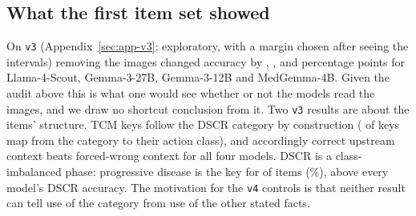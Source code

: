 \begin{table}[t]
\centering
\footnotesize
\setlength{\tabcolsep}{3pt}

\caption{E2: share of answers (\%) that equal the donor's key when the image is swapped, and when there is no image; the gain is the difference in percentage points.}
\label{tab:e2}
\end{table}

\begin{table}[t]
\centering
\footnotesize
\setlength{\tabcolsep}{3pt}

\caption{E3: TCM accuracy under true, random wrong and absent upstream context, and the share of answers that move to the rule's answer after the stated category is changed (label) or the stated timing crosses the 12-week window (timing, progressive-disease items).}
\label{tab:e3}
\end{table}

\begin{table}[t]
\centering
\footnotesize
\setlength{\tabcolsep}{3pt}

\caption{E5: PJRF Brier score with the true upstream context, against the leave-one-out constant base rate; skill $=1-$ Brier / base-rate Brier.}
\label{tab:e5}
\end{table}

\subsection{What the first item set showed}
\label{sec:v3-summary}

On \texttt{v3} (Appendix~\ref{sec:app-v3}; exploratory, with a margin chosen after seeing the intervals) removing the images changed accuracy by \vthreeDiffScout{}, \vthreeDiffGemmaTwentySeven{}, \vthreeDiffGemmaTwelve{} and \vthreeDiffMedGemma{} percentage points for Llama-4-Scout, Gemma-3-27B, Gemma-3-12B and MedGemma-4B. Given the audit above this is what one would see whether or not the models read the images, and we draw no shortcut conclusion from it. Two \texttt{v3} results are about the items' structure. TCM keys follow the DSCR category by construction (\tcmAgree{} of \tcmN{} keys map from the category to their action class), and accordingly correct upstream context beats forced-wrong context for all four models. DSCR is a class-imbalanced phase: progressive disease is the key for \dscrMajorityCount{} of \nPatVthree{} items (\dscrMajorityPct{}\%), above every model's DSCR accuracy. The motivation for the \texttt{v4} controls is that neither result can tell use of the category from use of the other stated facts.

